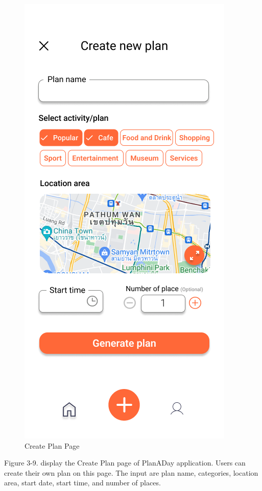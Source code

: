\newpage
\begin{figure}[!h]
    \centering
    \includegraphics[width=0.5\linewidth]{chapter3/UI_Create_plan.png}
    \caption{Create Plan Page}
    \label{fig:Create Plan Page}
\end{figure}
\noindent
Figure 3-9. display the Create Plan page of PlanADay application. Users can create
their own plan on this page. The input are plan name, categories, location area, start
date, start time, and number of places.


